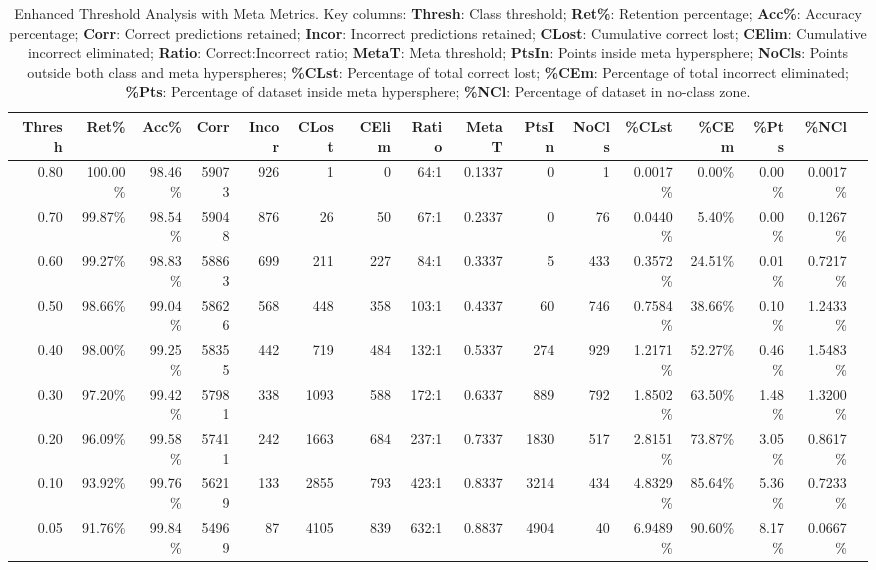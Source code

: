 \begin{table*}[ht]
\centering
\caption{Enhanced Threshold Analysis with Meta Metrics. Key columns:
\textbf{Thresh}: Class threshold;
\textbf{Ret\%}: Retention percentage;
\textbf{Acc\%}: Accuracy percentage;
\textbf{Corr}: Correct predictions retained;
\textbf{Incor}: Incorrect predictions retained;
\textbf{CLost}: Cumulative correct lost;
\textbf{CElim}: Cumulative incorrect eliminated;
\textbf{Ratio}: Correct:Incorrect ratio;
\textbf{MetaT}: Meta threshold;
\textbf{PtsIn}: Points inside meta hypersphere;
\textbf{NoCls}: Points outside both class and meta hyperspheres;
\textbf{\%CLst}: Percentage of total correct lost;
\textbf{\%CEm}: Percentage of total incorrect eliminated;
\textbf{\%Pts}: Percentage of dataset inside meta hypersphere;
\textbf{\%NCl}: Percentage of dataset in no-class zone.}
\label{tab:threshold_analysis}
\begin{tabular}{r r r r r r r r r r r r r r r r}
\toprule
Thresh & Ret\% & Acc\% & Corr & Incor & CLost & CElim & Ratio & MetaT & PtsIn & NoCls & \%CLst & \%CEm & \%Pts & \%NCl \\
\midrule
0.80 & 100.00\% & 98.46\% & 59073 & 926 & 1 & 0 & 64:1 & 0.1337 & 0 & 1 & 0.0017\% & 0.00\% & 0.00\% & 0.0017\% \\
0.70 & 99.87\% & 98.54\% & 59048 & 876 & 26 & 50 & 67:1 & 0.2337 & 0 & 76 & 0.0440\% & 5.40\% & 0.00\% & 0.1267\% \\
0.60 & 99.27\% & 98.83\% & 58863 & 699 & 211 & 227 & 84:1 & 0.3337 & 5 & 433 & 0.3572\% & 24.51\% & 0.01\% & 0.7217\% \\
0.50 & 98.66\% & 99.04\% & 58626 & 568 & 448 & 358 & 103:1 & 0.4337 & 60 & 746 & 0.7584\% & 38.66\% & 0.10\% & 1.2433\% \\
0.40 & 98.00\% & 99.25\% & 58355 & 442 & 719 & 484 & 132:1 & 0.5337 & 274 & 929 & 1.2171\% & 52.27\% & 0.46\% & 1.5483\% \\
0.30 & 97.20\% & 99.42\% & 57981 & 338 & 1093 & 588 & 172:1 & 0.6337 & 889 & 792 & 1.8502\% & 63.50\% & 1.48\% & 1.3200\% \\
0.20 & 96.09\% & 99.58\% & 57411 & 242 & 1663 & 684 & 237:1 & 0.7337 & 1830 & 517 & 2.8151\% & 73.87\% & 3.05\% & 0.8617\% \\
0.10 & 93.92\% & 99.76\% & 56219 & 133 & 2855 & 793 & 423:1 & 0.8337 & 3214 & 434 & 4.8329\% & 85.64\% & 5.36\% & 0.7233\% \\
0.05 & 91.76\% & 99.84\% & 54969 & 87 & 4105 & 839 & 632:1 & 0.8837 & 4904 & 40 & 6.9489\% & 90.60\% & 8.17\% & 0.0667\% \\
\bottomrule
\end{tabular}
\end{table*}

